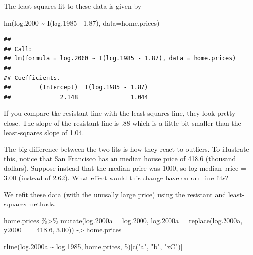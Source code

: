 \documentclass[
]{book}
\newenvironment{Shaded}{\begin{snugshade}}{\end{snugshade}}
\newcommand{\AttributeTok}[1]{\textcolor[rgb]{0.77,0.63,0.00}{#1}}
\newcommand{\DecValTok}[1]{\textcolor[rgb]{0.00,0.00,0.81}{#1}}
\newcommand{\FloatTok}[1]{\textcolor[rgb]{0.00,0.00,0.81}{#1}}
\newcommand{\FunctionTok}[1]{\textcolor[rgb]{0.00,0.00,0.00}{#1}}
\newcommand{\NormalTok}[1]{#1}
\newcommand{\OtherTok}[1]{\textcolor[rgb]{0.56,0.35,0.01}{#1}}
\newcommand{\SpecialCharTok}[1]{\textcolor[rgb]{0.00,0.00,0.00}{#1}}
\newcommand{\StringTok}[1]{\textcolor[rgb]{0.31,0.60,0.02}{#1}}
\begin{document}
The least-squares fit to these data is given by

\begin{Shaded}
\begin{Highlighting}[]
\FunctionTok{lm}\NormalTok{(log}\FloatTok{.2000} \SpecialCharTok{\textasciitilde{}} \FunctionTok{I}\NormalTok{(log}\FloatTok{.1985} \SpecialCharTok{{-}} \FloatTok{1.87}\NormalTok{), }\AttributeTok{data=}\NormalTok{home.prices)}
\end{Highlighting}
\end{Shaded}

\begin{verbatim}
## 
## Call:
## lm(formula = log.2000 ~ I(log.1985 - 1.87), data = home.prices)
## 
## Coefficients:
##        (Intercept)  I(log.1985 - 1.87)  
##              2.148               1.044
\end{verbatim}

If you compare the resistant line with the least-squares line, they look pretty close. The slope of the resistant line is .88 which is a little bit smaller than the least-squares slope of 1.04.

The big difference between the two fits is how they react to outliers. To illustrate this, notice that San Francisco has an median house price of 418.6 (thousand dollars). Suppose instead that the median price was 1000, so log median price = 3.00 (instead of 2.62). What effect would this change have on our line fits?

We refit these data (with the unusally large price) using the resistant and least-squares methods.

\begin{Shaded}
\begin{Highlighting}[]
\NormalTok{home.prices }\SpecialCharTok{\%\textgreater{}\%} 
  \FunctionTok{mutate}\NormalTok{(}\AttributeTok{log.2000a =}\NormalTok{ log}\FloatTok{.2000}\NormalTok{,}
         \AttributeTok{log.2000a =} \FunctionTok{replace}\NormalTok{(log}\FloatTok{.2000}\NormalTok{a, y2000 }\SpecialCharTok{==} \FloatTok{418.6}\NormalTok{,}
                             \FloatTok{3.00}\NormalTok{)) }\OtherTok{{-}\textgreater{}}\NormalTok{ home.prices}

\FunctionTok{rline}\NormalTok{(log}\FloatTok{.2000}\NormalTok{a }\SpecialCharTok{\textasciitilde{}}\NormalTok{ log}\FloatTok{.1985}\NormalTok{, }
\NormalTok{      home.prices, }\DecValTok{5}\NormalTok{)[}\FunctionTok{c}\NormalTok{(}\StringTok{"a"}\NormalTok{, }\StringTok{"b"}\NormalTok{, }\StringTok{"xC"}\NormalTok{)]}
\end{Highlighting}
\end{Shaded}
\end{document}
